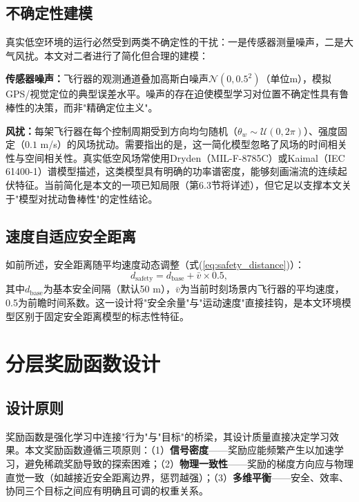 \documentclass[12pt,a4paper,UTF8]{ctexbook}
\begin{document}
\subsection{不确定性建模}

真实低空环境的运行必然受到两类不确定性的干扰：一是传感器测量噪声，二是大气风扰。本文对二者进行了简化但合理的建模：

\textbf{传感器噪声：}飞行器的观测通道叠加高斯白噪声$\mathcal{N}(0, 0.5^2)$（单位m），模拟GPS/视觉定位的典型误差水平。噪声的存在迫使模型学习对位置不确定性具有鲁棒性的决策，而非"精确定位主义"。

\textbf{风扰：}每架飞行器在每个控制周期受到方向均匀随机（$\theta_w\sim\mathcal{U}(0,2\pi)$）、强度固定（$0.1$ m/s）的风场扰动。需要指出的是，这一简化模型忽略了风场的时间相关性与空间相关性。真实低空风场常使用Dryden（MIL-F-8785C）\cite{ref26}或Kaimal（IEC 61400-1）\cite{ref44}谱模型描述，这类模型具有明确的功率谱密度，能够刻画湍流的连续起伏特征。当前简化是本文的一项已知局限（第6.3节将详述），但它足以支撑本文关于"模型对扰动鲁棒性"的定性结论。

\subsection{速度自适应安全距离}

如前所述，安全距离随平均速度动态调整（式(\ref{eq:safety_distance})）：
\begin{equation}
    d_{\text{safety}} = d_{\text{base}} + \bar{v} \times 0.5,
\end{equation}
其中$d_{\text{base}}$为基本安全间隔（默认50 m），$\bar{v}$为当前时刻场景内飞行器的平均速度，0.5为前瞻时间系数。这一设计将"安全余量"与"运动速度"直接挂钩，是本文环境模型区别于固定安全距离模型的标志性特征。

\section{分层奖励函数设计}

\subsection{设计原则}

奖励函数是强化学习中连接"行为"与"目标"的桥梁，其设计质量直接决定学习效果。本文奖励函数遵循三项原则：（1）\textbf{信号密度}——奖励应能频繁产生以加速学习，避免稀疏奖励导致的探索困难；（2）\textbf{物理一致性}——奖励的梯度方向应与物理直觉一致（如越接近安全距离边界，惩罚越强）；（3）\textbf{多维平衡}——安全、效率、协同三个目标之间应有明确且可调的权重关系。
\end{document}
